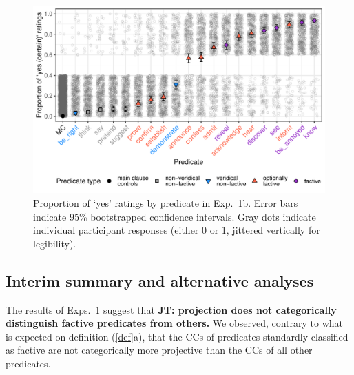 \documentclass[11pt,fleqn]{article}
\newcommand{\6}{\mbox{$[\hspace*{-.6mm}[$}}
\newcommand{\9}{\mbox{$]\hspace*{-.6mm}]$}}
\newcommand{\jt}[1]{\textbf{\color{blue}JT: #1}}
\begin{document}
\begin{figure}[H]

\centering
\includegraphics[width=.7\paperwidth]{../../results/8-projectivity-no-fact-binary/graphs/proportion-by-predicate-variability}
\caption{Proportion of `yes' ratings by predicate in Exp.~1b. Error bars indicate 95\% bootstrapped confidence intervals. Gray dots indicate individual participant responses (either 0 or 1, jittered vertically for legibility).}
\label{f-projectivity2}

\end{figure}

\subsection{Interim summary and alternative analyses}
\label{sec:interimproj}

The results of Exps.~1 suggest that \jt{projection does not categorically distinguish factive predicates from others.} We observed, contrary to what is expected on definition (\ref{def}a), that the CCs of predicates standardly classified as factive are not categorically more projective than the CCs of all other predicates. 
\end{document}
